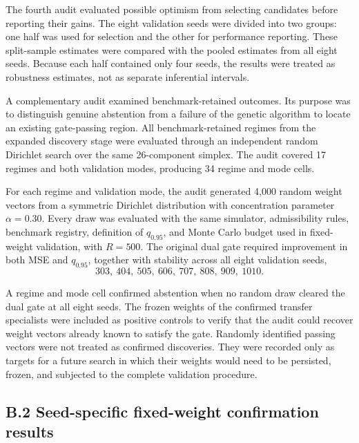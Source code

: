 The fourth audit evaluated possible optimism from selecting candidates before reporting their gains. The eight validation seeds were divided into two groups: one half was used for selection and the other for performance reporting. These split-sample estimates were compared with the pooled estimates from all eight seeds. Because each half contained only four seeds, the results were treated as robustness estimates, not as separate inferential intervals.

A complementary audit examined benchmark-retained outcomes. Its purpose was to distinguish genuine abstention from a failure of the genetic algorithm to locate an existing gate-passing region. All benchmark-retained regimes from the expanded discovery stage were evaluated through an independent random Dirichlet search over the same 26-component simplex. The audit covered 17 regimes and both validation modes, producing 34 regime and mode cells.

For each regime and validation mode, the audit generated 4,000 random weight vectors from a symmetric Dirichlet distribution with concentration parameter $\alpha=0.30$. Every draw was evaluated with the same simulator, admissibility rules, benchmark registry, definition of $q_{0.95}$, and Monte Carlo budget used in fixed-weight validation, with $R=500$. The original dual gate required improvement in both MSE and $q_{0.95}$, together with stability across all eight validation seeds,
\[
303,\ 404,\ 505,\ 606,\ 707,\ 808,\ 909,\ 1010.
\]

A regime and mode cell confirmed abstention when no random draw cleared the dual gate at all eight seeds. The frozen weights of the confirmed transfer specialists were included as positive controls to verify that the audit could recover weight vectors already known to satisfy the gate. Randomly identified passing vectors were not treated as confirmed discoveries. They were recorded only as targets for a future search in which their weights would need to be persisted, frozen, and subjected to the complete validation procedure.

\subsection*{B.2 Seed-specific fixed-weight confirmation results}


